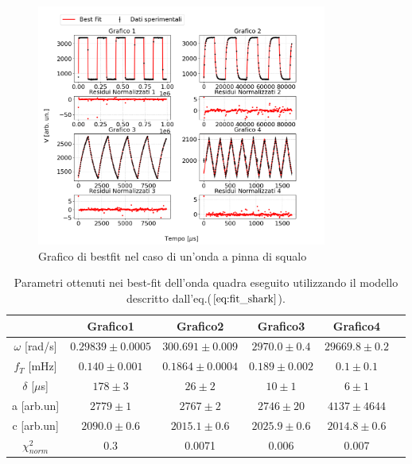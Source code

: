 \documentclass{article}
\begin{document}
                \begin{figure}[H]
                    \centering
                    \includegraphics[width=0.85\textwidth]{bestfit_sharkfins.png} %
                    \caption{Grafico di bestfit nel caso di un'onda a pinna di squalo
                    }
                    \label{fig:bestfit_shark.fig}
                \end{figure}     

                \begin{table}[H]
                    \centering
                    \begin{tabular}{cccccc}
                        \hline
                         & Grafico1 & Grafico2 & Grafico3 & Grafico4 \\
                        \hline
                        $\omega$ [rad/s]    & $0.29839 \pm 0.0005$      & $300.691\pm 0.009$    & $2970.0 \pm 0.4$      & $29669.8\pm 0.2$ \\
                        $f_T$ [mHz]         & $0.140 \pm 0.001$         & $0.1864 \pm 0.0004$   & $0.189 \pm 0.002$     & $0.1 \pm 0.1$ \\
                        $\delta$ [$\mu$s]   & $178 \pm 3$               & $26 \pm 2$            & $10\pm 1$             & $6 \pm 1$ \\
                        a [arb.un]          & $2779\pm 1$               & $2767 \pm 2$          & $2746\pm 20$          & $4137\pm 4644$ \\
                        c [arb.un]          & $2090.0 \pm 0.6 $         &$2015.1\pm 0.6$        & $2025.9 \pm 0.6$      & $2014.8 \pm 0.6$ \\
                        $\chi^{2}_{norm}$   & 0.3                       &0.0071                 & 0.006                 & 0.007\\
                        \hline
                    \end{tabular}
                    \caption{Parametri ottenuti nei best-fit dell'onda quadra eseguito utilizzando il modello descritto dall'eq.($\ref{eq:fit_shark}$).}
                    \label{tab:bestfit_params}
                \end{table}
\end{document}
